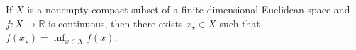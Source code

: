 If \(X\) is a nonempty compact subset of a finite-dimensional Euclidean space and \(f:X\to\mathbb R\) is continuous, then there exists \(x_\star\in X\) such that \(f(x_\star)=\inf_{x\in X}f(x)\).